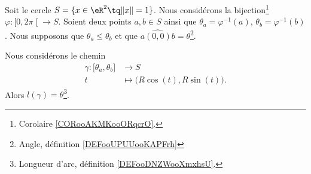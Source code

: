 \begin{proposition}     \label{PROPooDMSTooEOFExj}
    Soit le cercle \( S=\{ x\in \eR^2\tq \| x \|=1 \}\). Nous considérons la bijection\footnote{Corolaire \ref{CORooAKMKooORqcrO}.} \( \varphi\colon \mathopen[ 0 , 2\pi \mathclose[\to S\). Soient deux points \( a,b\in S\) ainsi que \( \theta_a=\varphi^{-1}(a)\), \( \theta_b=\varphi^{-1}(b)\). Nous supposons que \( \theta_a\leq \theta_b\) et que \( \widehat{a(0,0)b}=\theta\)\footnote{Angle, définition \ref{DEFooUPUUooKAPFrh}}.

    Nous considérons le chemin
    \begin{equation}
        \begin{aligned}
            \gamma\colon \mathopen[ \theta_a , \theta_b \mathclose]&\to S \\
            t&\mapsto \big( R\cos(t),R\sin(t) \big). 
        \end{aligned}
    \end{equation}
    Alors \( l(\gamma)=\theta\)\footnote{Longueur d'arc, définition \ref{DEFooDNZWooXmxhsU}.}.
\end{proposition}

